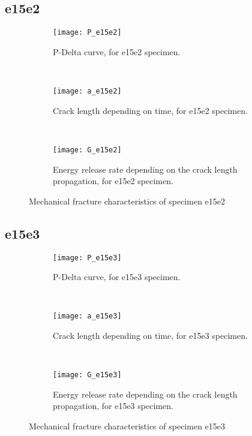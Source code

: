 \subsection{e15e2}

\begin{figure}[H]
	\centering
	\begin{subfigure}{0.48\linewidth}
		\centering
		\texttt{[image: P\_e15e2]}
		\decoRule
		\caption{P-Delta curve, for e15e2 specimen.}
		\label{fig:P_e15e2}
	\end{subfigure}
	\hfill \\
	\begin{subfigure}{0.48\linewidth}
		\centering
		\texttt{[image: a\_e15e2]}
		\decoRule
		\caption{Crack length depending on time, for e15e2 specimen.}
		\label{fig:a_e15e2}
	\end{subfigure}
	\hfill\\
	\begin{subfigure}{0.48\linewidth}
		\centering
		\texttt{[image: G\_e15e2]}
		\decoRule
		\caption{Energy release rate depending on the crack length propagation, for e15e2 specimen.}
		\label{fig:G_e15e2}
	\end{subfigure}
	\caption{Mechanical fracture characteristics of specimen e15e2}
	\label{E1o_a}
\end{figure}

\subsection{e15e3}

\begin{figure}[H]
	\centering
	\begin{subfigure}{0.48\linewidth}
		\centering
		\texttt{[image: P\_e15e3]}
		\decoRule
		\caption{P-Delta curve, for e15e3 specimen.}
		\label{fig:P_e15e3}
	\end{subfigure}
	\hfill \\
	\begin{subfigure}{0.48\linewidth}
		\centering
		\texttt{[image: a\_e15e3]}
		\decoRule
		\caption{Crack length depending on time, for e15e3 specimen.}
		\label{fig:a_e15e3}
	\end{subfigure}
	\hfill\\
	\begin{subfigure}{0.48\linewidth}
		\centering
		\texttt{[image: G\_e15e3]}
		\decoRule
		\caption{Energy release rate depending on the crack length propagation, for e15e3 specimen.}
		\label{fig:G_e15e3}
	\end{subfigure}
	\caption{Mechanical fracture characteristics of specimen e15e3}
	\label{E1o_a}
\end{figure}

